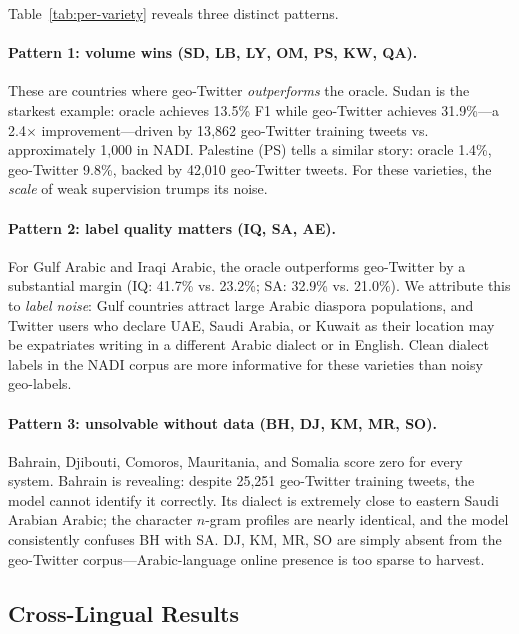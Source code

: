 \documentclass[11pt]{article}
\begin{document}
Table~\ref{tab:per-variety} reveals three distinct patterns.

\paragraph{Pattern 1: volume wins (SD, LB, LY, OM, PS, KW, QA).}
These are countries where geo-Twitter \emph{outperforms} the oracle.
Sudan is the starkest example: oracle achieves 13.5\% F1 while geo-Twitter
achieves 31.9\%---a 2.4$\times$ improvement---driven by 13{,}862 geo-Twitter
training tweets vs. approximately 1{,}000 in NADI.  Palestine (PS) tells a
similar story: oracle 1.4\%, geo-Twitter 9.8\%, backed by 42{,}010 geo-Twitter
tweets.  For these varieties, the \emph{scale} of weak supervision trumps its
noise.

\paragraph{Pattern 2: label quality matters (IQ, SA, AE).}
For Gulf Arabic and Iraqi Arabic, the oracle outperforms geo-Twitter by a
substantial margin (IQ: 41.7\% vs. 23.2\%; SA: 32.9\% vs. 21.0\%).
We attribute this to \emph{label noise}: Gulf countries attract large Arabic
diaspora populations, and Twitter users who declare UAE, Saudi Arabia, or Kuwait
as their location may be expatriates writing in a different Arabic dialect or in
English.  Clean dialect labels in the NADI corpus are more informative for these
varieties than noisy geo-labels.

\paragraph{Pattern 3: unsolvable without data (BH, DJ, KM, MR, SO).}
Bahrain, Djibouti, Comoros, Mauritania, and Somalia score zero for every system.
Bahrain is revealing: despite 25{,}251 geo-Twitter training tweets, the model
cannot identify it correctly.  Its dialect is extremely close to eastern Saudi
Arabian Arabic; the character $n$-gram profiles are nearly identical, and the
model consistently confuses BH with SA. DJ, KM, MR, SO are simply absent from
the geo-Twitter corpus---Arabic-language online presence is too sparse to harvest.

\subsection{Cross-Lingual Results}
\label{sec:crosslingual}
\end{document}
